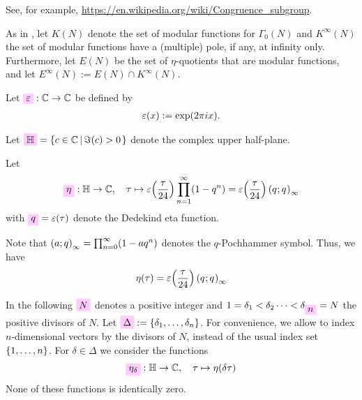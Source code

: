 \documentclass{article}
\begin{document}
See, for example,
\url{https://en.wikipedia.org/wiki/Congruence_subgroup}.

As in \cite{Radu:RamanujanKolberg:2015}, let $K(N)$ denote the set of
modular functions for $\Gamma_0(N)$ and $K^\infty(N)$ the set of
modular functions have a (multiple) pole, if any, at infinity only.
Furthermore, let $E(N)$ be the set of $\eta$-quotients that are
modular functions, and let $E^\infty(N) := E(N)\cap K^\infty(N)$.

\begin{Definition}\label{def:epsilon}
  Let $\defineNotation[epsilon]{\unityPowerSymbol}: \setC \to \setC$
  be defined by
  \begin{gather*}
    \varepsilon\!\left(x\right) := \exp(2\pi i x).
  \end{gather*}
\end{Definition}

Let $\defineNotation[H]{\setH}=\SetDef{c\in \setC}{\Im(c)>0}$ denote
the complex upper half-plane.

Let
\begin{gather}\label{eq:eta-expansion}
  \defineNotation[eta]{\eta}: \setH \to \setC, \quad
  \tau \mapsto \unityPower{\frac{\tau}{24}} \prod_{n=1}^{\infty}(1-q^n)
  =
  \unityPower{\frac{\tau}{24}} \eulerFunction{}
\end{gather}
with $\defineNotation[q]{q} = \unityPower{\tau}$
denote the Dedekind eta function.

Note that $\left( a;q \right)_{\infty} = \prod_{n=0}^{\infty}(1-aq^n)$ denotes
the $q$-Pochhammer symbol. Thus, we have
\begin{gather*}
  \eta(\tau) = \varepsilon\!\left(\frac{\tau}{24}\right) \left( q^{};q^{} \right)_{\infty}
\end{gather*}

In the following $\defineNotation[N]{N}$ denotes a positive integer
and $1=\delta_1<\delta_2\dots<\delta_{\defineNotation[n]{n}}=N$ the
positive divisors of $N$. Let
$\defineNotation[Delta]{\Delta}:=\Set{\delta_1,\ldots,\delta_n}$. For
convenience, we allow to index $n$-dimensional vectors by the divisors
of $N$, instead of the usual index set $\left\{1,\ldots,n\right\}$.
%
For $\delta\in\Delta$ we consider the functions
\begin{gather*}
  \defineNotation[eta-delta]{\eta_\delta}: \setH \to \setC,\quad \tau
  \mapsto \eta(\delta\tau)
\end{gather*}
None of these functions is identically zero.
\end{document}
